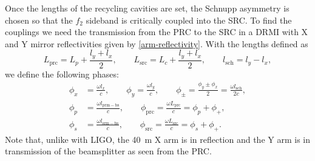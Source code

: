 \documentclass[12pt]{article}
\newcommand{\mr}[1]{\mathrm{#1}}
\begin{document}
Once the lengths of the recycling cavities are set, the Schnupp asymmetry is chosen so that the $f_2$ sideband is critically coupled into the SRC. To find the couplings we need the transmission from the PRC to the SRC in a DRMI with X and Y mirror reflectivities given by \eqref{arm-reflectivity}. With the lengths defined as
\begin{equation}
L_\mr{prc} = L_p + \frac{l_y + l_x}{2},\qquad
L_\mr{src} = L_c + \frac{l_y + l_x}{2}, \qquad
l_\mr{sch} = l_y - l_x,
\end{equation}
we define the following phases:
\begin{subequations}
\begin{align}
\phi_x &= \frac{\omega l_x}{c}, \qquad
\phi_y = \frac{\omega l_y}{c}, \qquad
\phi_\pm = \frac{\phi_y \pm \phi_x}{2} = \frac{\omega l_\mr{sch}}{2c}, \\
\phi_p &= \frac{\omega l_\mr{prm-bs}}{c}, \qquad
\phi_\mr{prc} = \frac{\omega L_\mr{prc}}{c} = \phi_p + \phi_+, \\
\phi_s &= \frac{\omega l_\mr{srm-bs}}{c}, \qquad
\phi_\mr{src} = \frac{\omega L_\mr{src}}{c} = \phi_s + \phi_+.
\end{align}
\end{subequations}
Note that, unlike with LIGO, the 40~m X arm is in reflection and the Y arm is in transmission of the beamsplitter as seen from the PRC.
\end{document}
